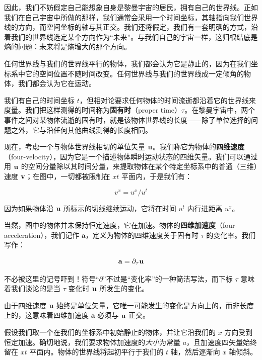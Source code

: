 因此，我们不妨假定自己能想象自身是黎曼宇宙的居民，拥有自己的世界线。正如我们在自己宇宙中所做的那样，我们通常会采用一个时间坐标，其轴指向我们世界线的方向，而空间坐标的轴与其正交。我们还将假定，我们有一套明确的方式，沿着我们的世界线选定某个方向作为“未来”。与我们自己的宇宙一样，这归根结底是熵的问题：未来将是熵增大的那个方向。

任何世界线与我们的世界线平行的物体，我们都会认为它是静止的，因为在我们坐标系中它的空间位置不随时间改变。任何世界线与我们的世界线成一定倾角的物体，我们都会认为它在运动。


我们有自己的时间坐标 $t$，但相对论要求任何物体的时间流逝都沿着它的世界线来度量。我们把这样测得的时间称为\textbf{固有时}（proper time）$\tau$。在黎曼宇宙中，两个事件之间对某物体流逝的固有时，就是该物体世界线的长度——除了单位选择的问题之外，它与沿任何其他曲线测得的长度相同。

现在，考虑一个与物体世界线相切的单位矢量 $\mathbf{u}$。我们称它为物体的\textbf{四维速度}（four-velocity），因为它是一个描述物体瞬时运动状态的四维矢量。我们可以通过用 $\mathbf{u}$ 的空间分量除以其时间分量，来提取物体在某个特定坐标系中的普通（三维）速度 $\mathbf{v}$；在图中，一切都被限制在 $xt$ 平面内，于是我们有：

\begin{equation}
v^{x} = u^{x}/u^{t}
\end{equation}

因为如果物体沿 $\mathbf{u}$ 所标示的切线继续运动，它将在时间 $u^{t}$ 内行进距离 $u^{x}$。

当然，图中的物体并未保持恒定速度，它在加速。物体的\textbf{四维加速度}（four-acceleration），我们记作 $\mathbf{a}$，定义为物体的四维速度关于固有时 $\tau$ 的变化率。我们写作：

\begin{equation}
\mathbf{a} = \partial_{\tau}\mathbf{u}
\end{equation}

不必被这里的记号吓到！符号“$\partial$”不过是“变化率”的一种简洁写法，而下标 $\tau$ 意味着我们谈论的是当 $\tau$ 变化时 $\mathbf{u}$ 所发生的变化。

由于四维速度 $\mathbf{u}$ 始终是单位矢量，它唯一可能发生的变化是方向上的，而非长度上的，这意味着四维加速度 $\mathbf{a}$ 必须与 $\mathbf{u}$ 正交。


假设我们取一个在我们的坐标系中初始静止的物体，并让它沿我们的 $x$ 方向受到恒定加速。确切地说，我们要求物体加速度的\emph{大小}为常量 $a$，且加速度四矢量始终留在 $xt$ 平面内。物体的世界线将起初平行于我们的 $t$ 轴，然后逐渐向 $x$ 轴倾斜。

